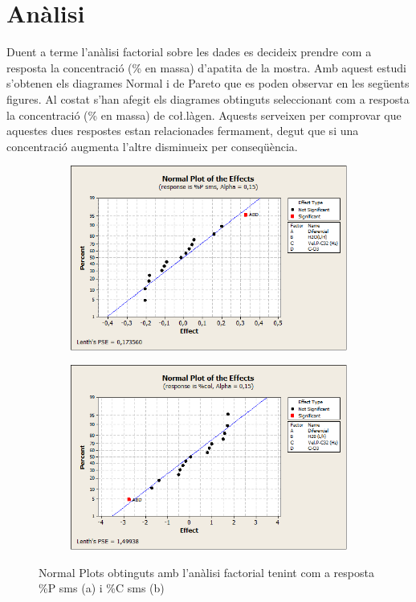 \documentclass[a4paper]{article}
\begin{document}
\section{Anàlisi}
Duent a terme l’anàlisi factorial sobre les dades es decideix prendre com a resposta la concentració (\% en massa) d’apatita de la mostra. Amb aquest estudi s’obtenen els diagrames Normal i de Pareto que es poden observar en les següents figures. Al costat s’han afegit els diagrames obtinguts seleccionant com a resposta la concentració (\% en massa) de co\l.làgen. Aquests serveixen per comprovar que aquestes dues respostes estan relacionades fermament, degut que si una concentració augmenta l’altre disminueix per conseqüència.
\begin{figure}[H]
	\begin{subfigure}{.5\textwidth}
		\centering
		\includegraphics[width=.9\linewidth]{images/NormalEffects15P}
		\caption{}
		\label{fig:NormalEffects15P}
	\end{subfigure}%
	\begin{subfigure}{.5\textwidth}
		\centering
		\includegraphics[width=.9\linewidth]{images/NormalEffects15col}
		\caption{}
		\label{fig:NormalEffects15C}
	\end{subfigure}
	\caption{Normal Plots obtinguts amb l’anàlisi factorial tenint com a resposta \%P sms (a) i \%C sms (b)}
	\label{fig:NormalEffects15}
\end{figure}
\end{document}

